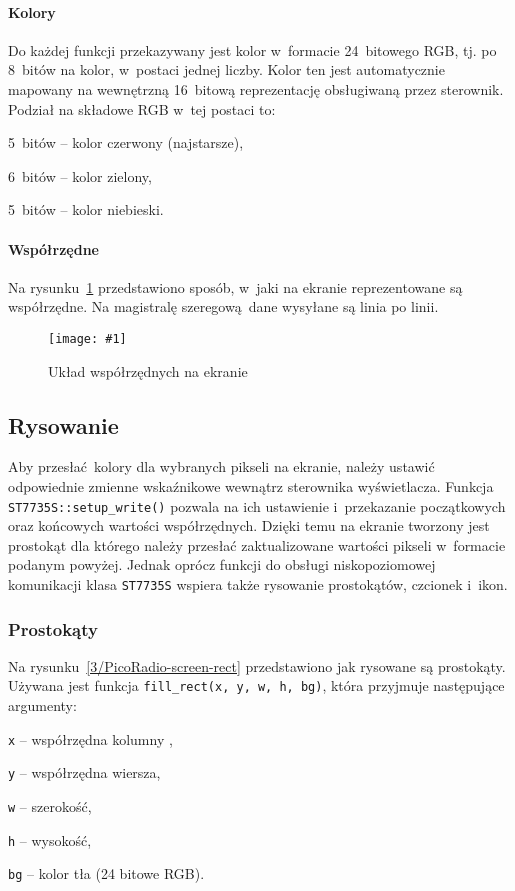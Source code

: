 \documentclass[polish]{aghengthesis}
\let\tempone\itemize
\let\temptwo\enditemize
\renewenvironment{itemize}{\tempone\setlength{\itemsep}{0cm}}{\temptwo}
\newcommand{\imgint}[4]{
	\begin{figure}[{#4}]
		\centering
		\texttt{[image: \#1]}
		\caption{#2}
		\label{#1}
	\end{figure}
}
\newcommand{\imgh}[3]{\imgint{#1}{#2}{#3}{H}}
\begin{document}
		\paragraph{Kolory}
			Do każdej funkcji przekazywany jest kolor w~formacie 24~bitowego RGB, tj. po 8~bitów na kolor, w~postaci jednej liczby. Kolor ten jest automatycznie mapowany na wewnętrzną 16~bitową reprezentację obsługiwaną przez sterownik. Podział na składowe RGB w~tej postaci to:
			\begin{itemize}
				\item 5~bitów -- kolor czerwony (najstarsze),
				\item 6~bitów -- kolor zielony,
				\item 5~bitów -- kolor niebieski.
			\end{itemize}
		
		\paragraph{Współrzędne}
			Na rysunku~\ref{3/PicoRadio-screen-xy} przedstawiono sposób, w~jaki na ekranie reprezentowane są współrzędne. Na magistralę szeregową dane wysyłane są linia po linii.
			
		\imgh{3/PicoRadio-screen-xy}{Układ współrzędnych na ekranie}{0.45}
		
		\subsection{Rysowanie}
			Aby przesłać kolory dla wybranych pikseli na ekranie, należy ustawić odpowiednie zmienne wskaźnikowe wewnątrz sterownika wyświetlacza. Funkcja \lstinline|ST7735S::setup_write()| pozwala na ich ustawienie i~przekazanie początkowych oraz końcowych wartości współrzędnych. Dzięki temu na ekranie tworzony jest prostokąt dla którego należy przesłać zaktualizowane wartości pikseli w~formacie podanym powyżej. Jednak oprócz funkcji do obsługi niskopoziomowej komunikacji klasa \lstinline|ST7735S|  wspiera także rysowanie prostokątów, czcionek i~ikon.
			
			\subsubsection{Prostokąty}
				Na rysunku~\ref{3/PicoRadio-screen-rect} przedstawiono jak rysowane są prostokąty. Używana jest funkcja \lstinline|fill_rect(x, y, w, h, bg)|, która przyjmuje następujące argumenty:
				\begin{itemize}
					\item \lstinline|x| -- współrzędna kolumny ,
					\item \lstinline|y| -- współrzędna wiersza,
					\item \lstinline|w| -- szerokość,
					\item \lstinline|h| -- wysokość,
					\item \lstinline|bg| -- kolor tła (24 bitowe RGB).
				\end{itemize}
				
\end{document}
